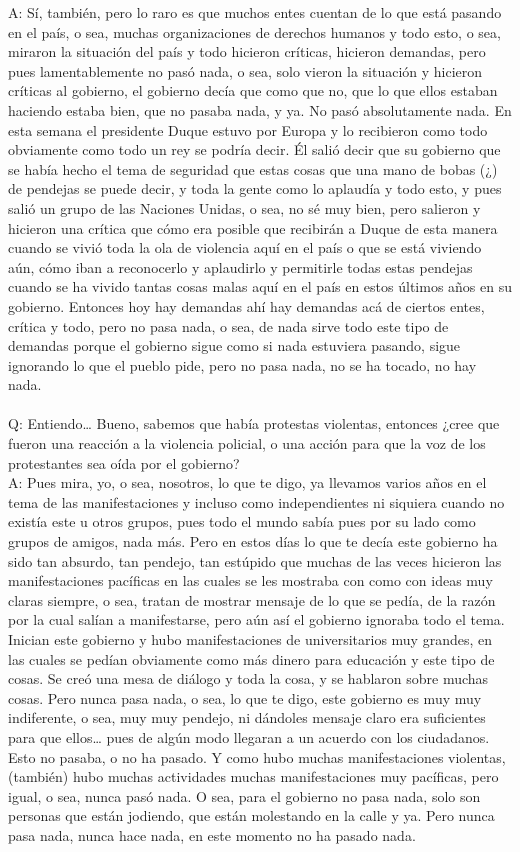 \documentclass{phyasgn}\usepackage{nag}
\begin{document}
A: Sí, también, pero lo raro es que muchos entes cuentan de lo que está pasando en el país, o sea, muchas organizaciones de derechos humanos y todo esto, o sea, miraron la situación del país y todo hicieron críticas, hicieron demandas, pero pues lamentablemente no pasó nada, o sea, solo vieron la situación y hicieron críticas al gobierno, el gobierno decía que como que no, que lo que ellos estaban haciendo estaba bien, que no pasaba nada, y ya. No pasó absolutamente nada. En esta semana el presidente Duque estuvo por Europa y lo recibieron como todo obviamente como todo un rey se podría decir. Él salió decir que su gobierno que se había hecho el tema de seguridad que estas cosas que una mano de bobas (¿) de pendejas se puede decir, y toda la gente como lo aplaudía y todo esto, y pues salió un grupo de las Naciones Unidas, o sea, no sé muy bien, pero salieron y hicieron una crítica que cómo era posible que recibirán a Duque de esta manera cuando se vivió toda la ola de violencia aquí en el país o que se está viviendo aún, cómo iban a reconocerlo y aplaudirlo y permitirle todas estas pendejas cuando se ha vivido tantas cosas malas aquí en el país en estos últimos años en su gobierno. Entonces hoy hay demandas ahí hay demandas acá de ciertos entes, crítica y todo, pero no pasa nada, o sea, de nada sirve todo este tipo de demandas porque el gobierno sigue como si nada estuviera pasando, sigue ignorando lo que el pueblo pide, pero no pasa nada, no se ha tocado, no hay nada.\\
\\
Q: Entiendo… Bueno, sabemos que había protestas violentas, entonces ¿cree que fueron una reacción a la violencia policial, o una acción para que la voz de los protestantes sea oída por el gobierno?\\
A: Pues mira, yo, o sea, nosotros, lo que te digo, ya llevamos varios años en el tema de las manifestaciones y incluso como independientes ni siquiera cuando no existía este u otros grupos, pues todo el mundo sabía pues por su lado como grupos de amigos, nada más. Pero en estos días lo que te decía este gobierno ha sido tan absurdo, tan pendejo, tan estúpido que muchas de las veces hicieron las manifestaciones pacíficas en las cuales se les mostraba con como con ideas muy claras siempre, o sea, tratan de mostrar mensaje de lo que se pedía, de la razón por la cual salían a manifestarse, pero aún así el gobierno ignoraba todo el tema. Inician este gobierno y hubo manifestaciones de universitarios muy grandes, en las cuales se pedían obviamente como más dinero para educación y este tipo de cosas. Se creó una mesa de diálogo y toda la cosa, y se hablaron sobre muchas cosas. Pero nunca pasa nada, o sea, lo que te digo, este gobierno es muy muy indiferente, o sea, muy muy pendejo, ni dándoles mensaje claro era suficientes para que ellos… pues de algún modo llegaran a un acuerdo con los ciudadanos. Esto no pasaba, o no ha pasado. Y como hubo muchas manifestaciones violentas, (también) hubo muchas actividades muchas manifestaciones muy pacíficas, pero igual, o sea, nunca pasó nada. O sea, para el gobierno no pasa nada, solo son personas que están jodiendo, que están molestando en la calle y ya. Pero nunca pasa nada, nunca hace nada, en este momento no ha pasado nada. \\ 
\end{document}
